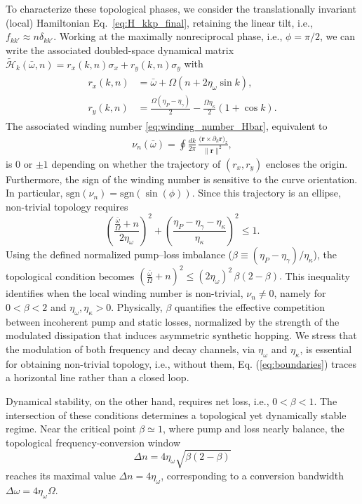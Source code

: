 \documentclass[prl,twocolumn,floatfix,10pt,superscriptaddress]{revtex4-2}
\newcommand{\mcl}[1]{\mathcal{#1}}
\newcommand{\bsb}[1]{\boldsymbol{#1}}
\newcommand{\bomega}{{\bar{\omega}}}
\newcommand{\mcH}{{\mcl{H}}}
\begin{document}
To characterize these topological phases, we consider the translationally invariant (local) Hamiltonian Eq.~\eqref{eq:H_kkp_final}, retaining the linear tilt, i.e., $f_{kk'}\approx n \delta_{kk'}$. Working at the maximally nonreciprocal phase, i.e., $\phi=\pi/2$, we can write the associated doubled-space dynamical matrix $\tilde{\mcH}_k(\bomega,n)=r_x(k,n)\sigma_x+r_y(k,n)\sigma_y$ with
\begin{align}\begin{aligned}
r_x(k,n)&=\bar{\omega} +\Omega\left(n+2\eta_\omega \sin k\right), \\
r_y(k,n)&=\tfrac{\Omega(\eta_P-\eta_\gamma)}{2}-\tfrac{\Omega\eta_\kappa }{2}(1+\cos k).
\end{aligned}
\label{eq:rxry}
\end{align}
The associated winding number \eqref{eq:winding_number_Hbar}, equivalent to 
\begin{align}
    \nu_n(\bomega)=\oint \frac{dk}{2\pi}\,\frac{\big(\bsb{r}\times \partial_k \bsb{r}\big)_z}{\|\bsb{r}\|^2},
\end{align}
is $0$ or $\pm 1$ depending on whether the trajectory of $(r_x,r_y)$ encloses the origin. Furthermore, the sign of the winding number is sensitive to the curve orientation. In particular, $\mathrm{sgn}(\nu_n)=\mathrm{sgn}(\sin(\phi))$. Since this trajectory is an ellipse, non-trivial topology requires
\begin{equation}
\left(\frac{\frac{\bomega}{\Omega}+n}{2\eta_\omega}\right)^2
+\left(\frac{\eta_P-\eta_\gamma-\eta_\kappa}{\eta_\kappa}\right)^2\le1.
\label{eq:boundaries}
\end{equation}
Using the defined normalized pump--loss imbalance ($\beta \equiv (\eta_P - \eta_\gamma)/\eta_\kappa$), 
the topological condition becomes $\left( \frac{\bar{\omega}}{\Omega} + n \right)^2 \le (2\eta_\omega)^2\,\beta(2-\beta).$
This inequality identifies when the local winding number is non-trivial, $\nu_n \neq 0$, namely for $0 < \beta < 2$ and $\eta_\omega,\eta_\kappa > 0$. Physically, $\beta$ quantifies the effective competition between incoherent pump and static losses, normalized by the strength of the modulated dissipation that induces asymmetric synthetic hopping. We stress that the modulation of both frequency and decay channels, via $\eta_\omega$  and $\eta_\kappa$, is essential for obtaining non-trivial topology, i.e., without them, Eq. (\ref{eq:boundaries}) traces a horizontal line rather than a closed loop.

Dynamical stability, on the other hand, requires net loss, i.e., $0 < \beta < 1$. The intersection of these conditions determines a topological yet dynamically stable regime. Near the critical point $\beta \simeq 1$, where pump and loss nearly balance, the topological frequency-conversion window
\[
\Delta n = 4\eta_\omega \sqrt{\beta(2-\beta)}
\]
reaches its maximal value $\Delta n = 4\eta_\omega$, corresponding to a conversion bandwidth $\Delta\omega = 4\eta_\omega \Omega$.
\end{document}
